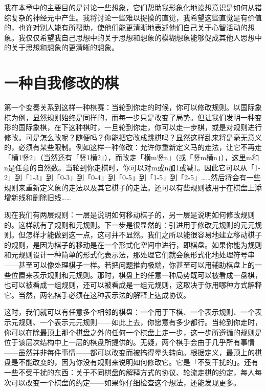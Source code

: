 \documentclass[
  12pt,
  twoside,
  openright,
  oldfontcommands,
]{memoir}
\begin{document}
我在本章中的主要目的是讨论一些想象，它们帮助我形象化地设想意识是如何从错综复杂的神经元中产生。我将讨论一些难以捉摸的直觉，我希望这些直觉是有价值的，也许对别人能有所帮助，使他们能更清晰地表述他们自己关于心智活动的想象。我仅仅希望我自己思想中的关于思想和想象的模糊想象能够促成其他人思想中的关于思想和想象的更清晰的想象。

\section{一种自我修改的棋}

第一个变奏关系到这样一种棋赛：当轮到你走的时候，你可以修改规则。以国际象棋为例，显然规则始终是同样的，而每一步只是改变了局势。但让我们发明一种变形的国际象棋，在下这种棋时，一旦轮到你走，你可以走一步棋，或是对规则进行修改。可是怎么改呢？随便吗？你能把它改成跳棋吗？显然这样乱来将是毫无意义的，必须有某些限制。例如这样一种修改：允许你重新定义马的走法，让它不再走「横1竖2」（当然还有「竖1横2」），而改走「横m竖n」（或「竖m横n」），这里m和n是任意的自然数。当轮到你走棋时，你可以对m或n加1或减1。因此它可以从「1-2」到「1-3」到「0-3」到「0-4」到「0-5」到「1-5」到「2-5」\ldots\ldots 然后将会有一些规则来重新定义象的走法以及其它棋子的走法。还可以有些规则被用于在棋盘上添增新线和删除旧线\ldots\ldots{}

现在我们有两层规则：一层是说明如何移动棋子的，另一层是说明如何修改规则的。这样就有了规则和元规则。下一步是很显然的：引进用于修改元规则的元元规则。但怎样才能做到这一点，这可并不显然。我们之所以能很容易地建立移动棋子的规则，是因为棋子的移动是在一个形式化空间中进行，即棋盘。如果你能为规则和元规则设计一种简单的形式化表示法，那处理它们就会象形式化地处理符号串------甚至可以像处理棋子一样。若把问题推向极端，你甚至可以用辅助棋盘上的一些位置来表示规则和元规则。那时，棋盘上的任意一种局势既可以被看成一盘棋，也可以被看成一组规则，还可以被看成是一组元规则，这取决于你用哪种方式解释它。当然，两名棋手必须在这种表示法的解释上达成协议。

这时，我们就可以有任意多个相邻的棋盘：一个用于下棋、一个表示规则、一个表示元规则、一个表示元元规则------如此上去，你愿意有多少都行。当轮到你走时，你可以在除最顶上那个棋盘之外的任何一个棋盘上走一步，这一步所遵循的规则是位于该层次结构中上一层的棋盘所提供的。无疑，两个棋手会由于几乎所有事情------虽然并非每件事情------都可以改变而被搞得晕头转向。根据定义，最顶上的棋盘是不能改变的，因为你没有规则来说明如何修改它。它是「不受干扰的」。还有一些不受干扰的东西：关于不同棋盘的解释方式的协议、轮流走棋的约定，每人每次可以改变一个棋盘的约定------如果你仔细检查这个想法，还能发现更多。
\end{document}
